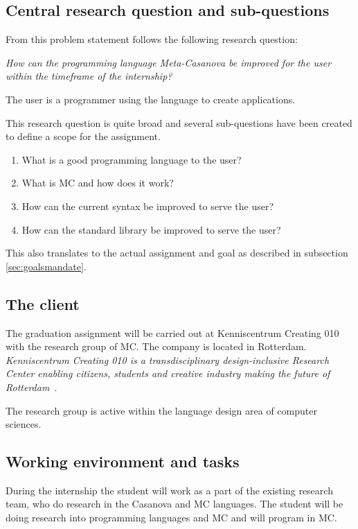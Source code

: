 \subsection{Central research question and sub-questions}
From this problem statement follows the following research question:

\emph{How can the programming language Meta-Casanova be improved for the user within the timeframe of the internship?}

The user is a programmer using the language to create applications.

This research question is quite broad and several sub-questions have been created to define a scope for the assignment.

\begin{enumerate}[noitemsep]
   \item What is a good programming language to the user?
   \item What is MC and how does it work?
   \item How can the current syntax be improved to serve the user?
   \item How can the standard library be improved to serve the user?
\end{enumerate}

This also translates to the actual assignment and goal as described in subsection \ref{sec:goalsmandate}.

\subsection{The client}\label{sec:clientmandate}
The graduation assignment will be carried out at Kenniscentrum Creating 010 with the research group of MC.
The company is located in Rotterdam.
\textit{Kenniscentrum Creating 010 is a transdisciplinary design-inclusive Research Center enabling citizens, students and creative industry making the future of Rotterdam}~\cite{creating2016home}.

The research group is active within the language design area of computer sciences.


\subsection{Working environment and tasks}\label{sec:workenvmandate}
During the internship the student will work as a part of the existing research team, who do research in the Casanova and MC languages.
The student will be doing research into programming languages and MC and will program in MC.

